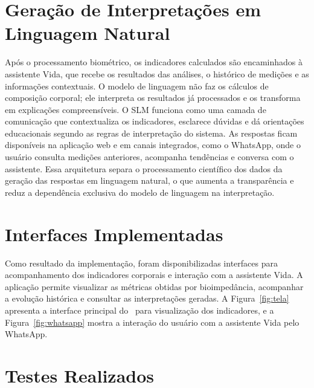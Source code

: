 \section{Geração de Interpretações em Linguagem Natural}

Após o processamento biométrico, os indicadores calculados são encaminhados à assistente
Vida, que recebe os resultados das análises, o histórico de medições e as informações
contextuais. O modelo de linguagem não faz os cálculos de composição corporal; ele
interpreta os resultados já processados e os transforma em explicações compreensíveis. O SLM
funciona como uma camada de comunicação que contextualiza os indicadores,
esclarece dúvidas e dá orientações educacionais segundo as regras de interpretação do
sistema. As respostas ficam disponíveis na aplicação web e em canais integrados, como o
WhatsApp, onde o usuário consulta medições anteriores, acompanha tendências e conversa com o
assistente. Essa arquitetura separa o processamento científico dos dados da geração das
respostas em linguagem natural, o que aumenta a transparência e reduz a dependência
exclusiva do modelo de linguagem na interpretação.

\section{Interfaces Implementadas}
\label{sec:interfaces}

Como resultado da implementação, foram disponibilizadas interfaces para acompanhamento dos
indicadores corporais e interação com a assistente Vida. A aplicação permite visualizar as
métricas obtidas por bioimpedância, acompanhar a evolução histórica e consultar as
interpretações geradas. A Figura~\ref{fig:tela} apresenta a interface principal do
\sintonia\ para visualização dos indicadores, e a Figura~\ref{fig:whatsapp} mostra a
interação do usuário com a assistente Vida pelo WhatsApp.



\section{Testes Realizados}
\label{sec:testes}

